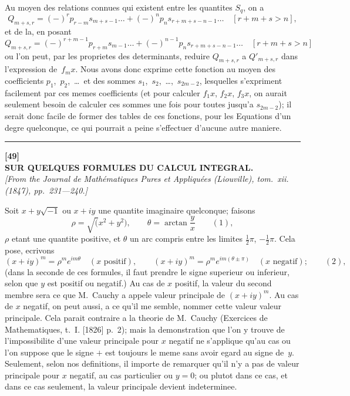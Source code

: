 \documentclass[11pt,a4paper]{book}
\begin{document}
\newpage
Au moyen des relations connues qui existent entre les quantites $S_q$, on a
\[
Q_{m+s,r} = (-)^r p_{r-m} s_{m+s-1} \ldots + (-)^n p_n s_{r+m+s-n-1} \ldots \quad [r+m+s > n],
\]
et de la, en posant
\[
Q_{m+s,r} = (-)^{r+m-1} p_{r+m} s_{m-1} \ldots + (-)^{n-1} p_n s_{r+m+s-n-1} \ldots \quad [r+m+s > n]
\]
ou l'on peut, par les proprietes des determinants, reduire $Q_{m+s,r}$ a $Q'_{m+s,r}$ dans l'expression de~$f_m x$. Nous avons donc exprime cette fonction au moyen des coefficients $p_1$,~$p_2$,~\ldots\ et des sommes $s_1$,~$s_2$,~\ldots,~$s_{2m-2}$, lesquelles s'expriment facilement par ces memes coefficients (et pour calculer $f_1x$, $f_2x$, $f_3x$, on aurait seulement besoin de calculer ces sommes une fois pour toutes jusqu'a $s_{2m-2}$); il serait donc facile de former des tables de ces fonctions, pour les Equations d'un degre quelconque, ce qui pourrait a peine s'effectuer d'aucune autre maniere.

\vspace{20pt}
\begin{center}
\rule{0.5\textwidth}{0.4pt}
\end{center}


\newpage
\begin{center}
\textbf{[49]}\\[4pt]
\textbf{\large SUR QUELQUES FORMULES DU CALCUL INTEGRAL.}\\[4pt]
\textit{[From the Journal de Math\'ematiques Pures et Appliqu\'ees (Liouville), tom.~xii. (1847), pp.~231---240.]}
\end{center}

\vspace{6pt}

Soit $x + y\surd{-1}$ ou $x+iy$ une quantite imaginaire quelconque; faisons
\[
\rho = \surd(x^2+y^2), \qquad \theta = \arctan\frac{y}{x} \qquad(1),
\]
$\rho$ etant une quantite positive, et $\theta$ un arc compris entre les limites $\frac{1}{2}\pi$, $-\frac{1}{2}\pi$. Cela pose, ecrivons
\[
(x+iy)^m = \rho^m e^{im\theta} \quad (x \text{ positif}), \qquad (x+iy)^m = \rho^m e^{im(\theta\pm\pi)} \quad (x \text{ negatif}); \qquad(2),
\]
(dans la seconde de ces formules, il faut prendre le signe superieur ou inferieur, selon que $y$ est positif ou negatif.) Au cas de $x$ positif, la valeur du second membre sera ce que M.~Cauchy a appele valeur principale de $(x+iy)^m$. Au cas de $x$ negatif, on peut aussi, a ce qu'il me semble, nommer cette valeur valeur principale. Cela parait contraire a la theorie de M.~Cauchy (Exercices de Mathematiques, t.~I. [1826] p.~2); mais la demonstration que l'on y trouve de l'impossibilite d'une valeur principale pour $x$ negatif ne s'applique qu'au cas ou l'on suppose que le signe $+$ est toujours le meme sans avoir egard au signe de~$y$. Seulement, selon nos definitions, il importe de remarquer qu'il n'y a pas de valeur principale pour $x$ negatif, au cas particulier ou $y=0$; ou plutot dans ce cas, et dans ce cas seulement, la valeur principale devient indeterminee.
\end{document}
